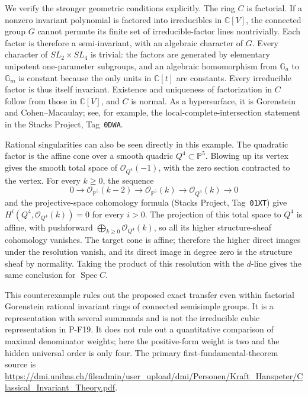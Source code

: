 We verify the stronger geometric conditions explicitly. The ring
$C$ is factorial. If a nonzero invariant polynomial is factored
into irreducibles in $\mathbb C[V]$, the connected group $G$
cannot permute its finite set of irreducible-factor lines
nontrivially. Each factor is therefore a semi-invariant, with
an algebraic character of $G$. Every character of $SL_2\times SL_4$
is trivial: the factors are generated by elementary unipotent
one-parameter subgroups, and an algebraic homomorphism from
$\mathbb G_a$ to $\mathbb G_m$ is constant because the only units
in $\mathbb C[t]$ are constants. Every irreducible factor is thus
itself invariant. Existence and uniqueness of factorization in
$C$ follow from those in $\mathbb C[V]$, and $C$ is normal.
As a hypersurface, it is Gorenstein and Cohen--Macaulay; see, for
example, the local-complete-intersection statement in the Stacks
Project, Tag~\texttt{0DWA}.

Rational singularities can also be seen directly in this example.
The quadratic factor is the affine cone over a smooth quadric
$Q^4\subset\mathbb P^5$. Blowing up its vertex gives the smooth
total space of $\mathcal O_{Q^4}(-1)$, with the zero section
contracted to the vertex. For every $k\ge0$, the sequence
\[
 0\longrightarrow\mathcal O_{\mathbb P^5}(k-2)
 \longrightarrow\mathcal O_{\mathbb P^5}(k)
 \longrightarrow\mathcal O_{Q^4}(k)\longrightarrow0
\]
and the projective-space cohomology formula (Stacks Project,
Tag~\texttt{01XT}) give
$H^i(Q^4,\mathcal O_{Q^4}(k))=0$ for every $i>0$.
The projection of this total space to $Q^4$ is affine, with
pushforward $\bigoplus_{k\ge0}\mathcal O_{Q^4}(k)$, so all its
higher structure-sheaf cohomology vanishes. The target cone is
affine; therefore the higher direct images under the resolution
vanish, and its direct image in degree zero is the structure
sheaf by normality. Taking the product of this resolution with
the $d$-line gives the same conclusion for $\operatorname{Spec}C$.

This counterexample rules out the proposed exact transfer even
within factorial Gorenstein rational invariant rings of connected
semisimple groups. It is a representation with several summands
and is not the irreducible cubic representation in P-F19. It does
not rule out a quantitative comparison of maximal denominator
weights; here the positive-form weight is two and the hidden
universal order is only four. The primary first-fundamental-theorem
source is
\url{https://dmi.unibas.ch/fileadmin/user_upload/dmi/Personen/Kraft_Hanspeter/Classical_Invariant_Theory.pdf}.

